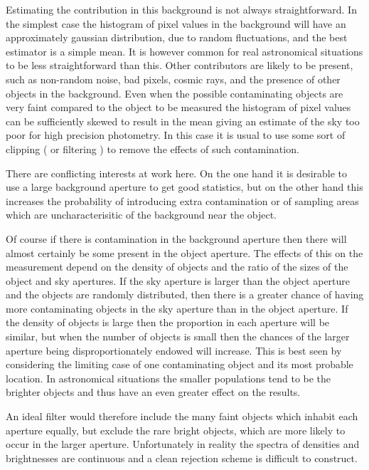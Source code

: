 Estimating the contribution in this background is not always straightforward.
In the simplest case the histogram of pixel values in the background will
have an approximately gaussian distribution, due to random fluctuations,
and the best estimator is a simple mean.
It is however common for real astronomical situations to be less
straightforward than this.
Other contributors are likely to be present, such as non-random noise,
bad pixels, cosmic rays, and the presence of other objects in the background.
Even when the possible contaminating objects are very faint compared to the
object to be measured the histogram of pixel values can be sufficiently
skewed to result in the mean giving an estimate of the sky too poor for high
precision photometry.
In this case it is usual to use some sort of clipping ( or filtering ) to
remove the effects of such contamination.

There are conflicting interests at work here. On the one hand it is
desirable to use a large background aperture to get good statistics, but
on the other hand this increases the probability of introducing extra
contamination or of sampling areas which are uncharacterisitic of the
background near the object.

Of course if there is contamination in the background aperture then there
will almost certainly be some present in the object aperture. The effects
of this on the measurement depend on the density of objects and the ratio
of the sizes of the object and sky apertures. If the sky aperture is
larger than the object aperture and the objects are randomly distributed,
then there is a greater chance of having more contaminating objects in the
sky aperture than in the object aperture.
If the density of objects is large then the proportion in each aperture will
be similar, but when the number of objects is small then the chances of
the larger aperture being disproportionately endowed will increase. This
is best seen by considering the limiting case of one contaminating object
and its most probable location. In astronomical situations the smaller
populations tend to be the brighter objects and thus have an even greater
effect on the results.

An ideal filter would therefore include the many faint objects which
inhabit each aperture equally, but exclude the rare bright objects, which
are more likely to occur in the larger aperture. Unfortunately in reality
the spectra of densities and brightnesses are continuous and a clean
rejection scheme is difficult to construct.

